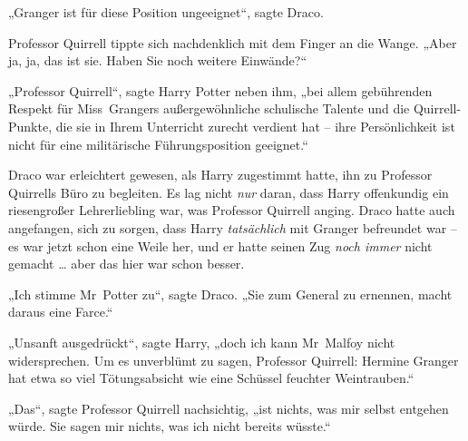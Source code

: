 „Granger ist für diese Position ungeeignet“, sagte Draco.

Professor Quirrell tippte sich nachdenklich mit dem Finger an die Wange.
„Aber ja, ja, das ist sie. Haben Sie noch weitere Einwände?“

„Professor Quirrell“, sagte Harry Potter neben ihm, „bei allem gebührenden Respekt für Miss~Grangers außergewöhnliche schulische Talente und die Quirrell-Punkte, die sie in Ihrem Unterricht zurecht verdient hat – ihre Persönlichkeit ist nicht für eine militärische Führungsposition geeignet.“

Draco war erleichtert gewesen, als Harry zugestimmt hatte, ihn zu Professor Quirrells Büro zu begleiten. Es lag nicht \emph{nur} daran, dass Harry offenkundig ein riesengroßer Lehrerliebling war, was Professor Quirrell anging. Draco hatte auch angefangen, sich zu sorgen, dass Harry \emph{tatsächlich} mit Granger befreundet war – es war jetzt schon eine Weile her, und er hatte seinen Zug \emph{noch immer} nicht gemacht … aber das hier war schon besser.

„Ich stimme Mr~Potter zu“, sagte Draco.
„Sie zum General zu ernennen, macht daraus eine Farce.“

„Unsanft ausgedrückt“, sagte Harry, „doch ich kann Mr~Malfoy nicht widersprechen. Um es unverblümt zu sagen, Professor Quirrell: Hermine Granger hat etwa so viel Tötungsabsicht wie eine Schüssel feuchter Weintrauben.“

„Das“, sagte Professor Quirrell nachsichtig, „ist nichts, was mir selbst entgehen würde. Sie sagen mir nichts, was ich nicht bereits wüsste.“

